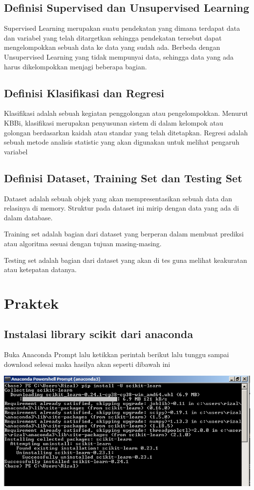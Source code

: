 \documentclass{article}
\begin{document}
\subsection{Definisi Supervised dan Unsupervised Learning}
Supervised Learning merupakan suatu pendekatan yang dimana terdapat data dan variabel yang telah ditargetkan sehingga pendekatan tersebut dapat mengelompokkan sebuah data ke data yang sudah ada. Berbeda dengan Unsupervised Learning yang tidak mempunyai data, sehingga data yang ada harus dikelompokkan menjagi beberapa bagian.

\subsection{Definisi Klasifikasi dan Regresi}
Klasifikasi adalah sebuah kegiatan penggolongan atau pengelompokkan. Menurut KBBi, klasifikasi merupakan penyusunan sistem di dalam kelompok atau golongan berdasarkan kaidah atau standar yang telah ditetapkan. 
Regresi adalah sebuah metode analisis statistic yang akan digunakan untuk melihat pengaruh variabel

\subsection{Definisi Dataset, Training Set dan Testing Set}
Dataset adalah sebuah objek yang akan mempresentasikan sebuah data dan relasinya di memory. Struktur pada dataset ini mirip dengan data yang ada di dalam database. 

Training set adalah bagian dari dataset yang berperan dalam membuat prediksi atau algoritma sesuai dengan tujuan masing-masing.

Testing set adalah bagian dari dataset yang akan di tes guna melihat keakuratan atau ketepatan datanya.

\section{Praktek}
\subsection{Instalasi library scikit dari anaconda}
Buka Anaconda Prompt lalu ketikkan perintah berikut lalu tunggu sampai download selesai maka hasilya akan seperti dibawah ini

\begin{center}
    \includegraphics[width=.8\textwidth]{figures/1184033/chapter1/1.PNG}
\end{center}
\end{document}
